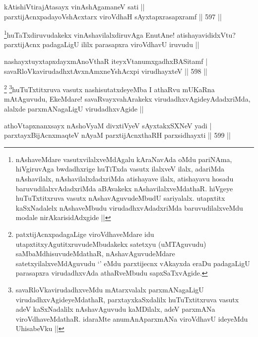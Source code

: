\begin{shl}
kA\s tishiVtirajAtasayx vinAshAgamaneV sati ||  \\
parxtijAcnxpadayoVshAcxtarx viroVdhaH sAyxtapxrasapxramf \hfill||  597 ||  
\end{shl}

\begin{artha}
\footnote{nAshaveMdare vasutxvilalxveMdAgalu kAraNavAda oMdu pariNAma, hiVgiruvAga bwdadhxrige huTiTxda vasutx ilalxveV ilalx, adariMda nAshavilalx, nAshavilalxdadxriMda atishayave ilalx, atishayavu hosadu baruvudilalxvAdadxriMda aBAvakekx nAshavilalxveMdathaR. hiVgeye huTuTxtitxruva vasutx nAshavAguvudeMbudU sariyalalx. utapxtitx kaSxNadalelx nAshaveMbudu virudadhxvAdadxriMda baruvudilalxveMdu modale nirAkarisidAdxgide ||}huTaTxdiruvudakekx vinAshavilalxdiruvAga EnutAne! atishayavididxVtu? parxtijAcnx padagaLigU ililx parasapxra viroVdhavU iruvudu ||
\end{artha}


\begin{shl}
nashayxtuyxtapxdayxmAnoV\s thaR iteyxVtanumxgadhxBASitamf | \\
savaRloVkavirudadhxtAvxnAmxneYshAcxpi virudhayxteV \hfill||  598 ||  
\end{shl}

\begin{artha}
\footnote{patxtijAcnxpadagaLige viroVdhaveMdare idu utapxtitxyAgutitxruvudeMbudakekx satetxyu (uMTAguvudu) saMbaMdhisuvudeMdathaR, nAshavAguvudeMdare satetxyilalxveMdAguvudu `\stext' eMdu parxtijecnx vAkayxda eraDu padagaLigU parasapxra virudadhxvAda athaRveMbudu sapxSaTxvAgide.}
\footnote{savaRloVkavirudadhxveMdu mAtarxvalalx parxmANagaLigU virudadhxvAgideyeMdathaR, parxtayxkaSxdalilx huTuTxtitxruva vasutx adeV kaSxNadalilx nAshavAguvudu kaMDilalx, adeV parxmANa viroVdhaveMdathaR. idaraMte anumAnAparxmANa viroVdhavU ideyeMdu UhisabeVku ||}huTuTxtitxruva vasutx nashisutatxdeyeMba I athaRvu mUKaRna mAtAguvudu, EkeMdare! savaRvayxvahArakekx virudadhxvAgideyAdadxriMda, alalxde parxmANagaLigU virudadhxvAgide ||
\end{artha}


\begin{shl}
athoVtapxnanxsayx nAshoV\s yaM divxtiVyeV sAyxtakxSXNeV yadi | \\
parxtayxBijAcnxmaqteV nAyaM parxtijAcnxthaRH parxsidhayxti \hfill||  599 ||  
\end{shl}

